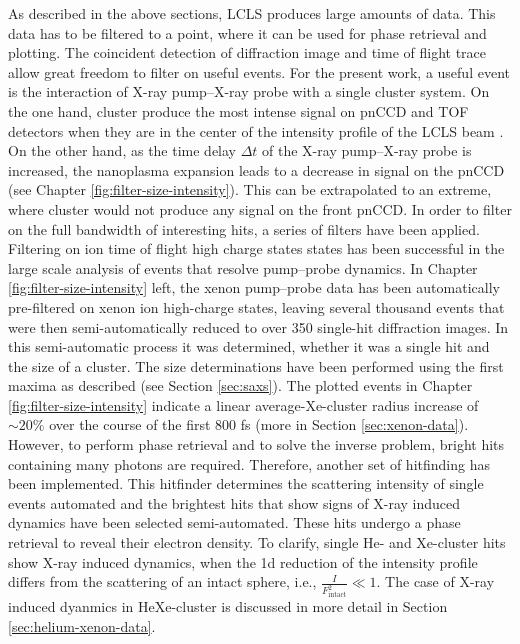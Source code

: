 As described in the above sections, LCLS produces large amounts of data. This data has to be filtered to a point, where it can be used for phase retrieval and plotting. The coincident detection of diffraction image and time of flight trace allow great freedom to filter on useful events. For the present work, a useful event is the interaction of X-ray pump--X-ray probe with a single cluster system. On the one hand, cluster produce the most intense signal on pnCCD and TOF detectors when they are in the center of the intensity profile of the LCLS beam \citep{Gorkhover-2012-PRL}. On the other hand, as the time delay $\Delta t$ of the X-ray pump--X-ray probe is increased, the nanoplasma expansion leads to a decrease in signal on the pnCCD (see Chapter \ref{fig:filter-size-intensity}). This can be extrapolated to an extreme, where cluster would not produce any signal on the front pnCCD. In order to filter on the full bandwidth of interesting hits, a series of filters have been applied. Filtering on ion time of flight high charge states states has been successful in the large scale analysis of events that resolve pump--probe dynamics. In Chapter \ref{fig:filter-size-intensity} left, the xenon pump--probe data has been automatically pre-filtered on xenon ion high-charge states, leaving several thousand events that were then semi-automatically reduced to over 350 single-hit diffraction images. In this semi-automatic process it was determined, whether it was a single hit and the size of a cluster. The size determinations have been performed using the first maxima as described (see Section \ref{sec:saxs}). The plotted events in Chapter \ref{fig:filter-size-intensity} indicate a linear average-Xe-cluster radius increase of $\sim 20\%$ over the course of the first 800 fs (more in Section \ref{sec:xenon-data}). However, to perform phase retrieval and to solve the inverse problem, bright hits containing many photons are required. Therefore, another set of hitfinding has been implemented. This hitfinder determines the scattering intensity of single events automated and the brightest hits that show signs of X-ray induced dynamics have been selected semi-automated. These hits undergo a phase retrieval to reveal their electron density. To clarify, single He- and Xe-cluster hits show X-ray induced dynamics, when the 1d reduction of the intensity profile differs from the scattering of an intact sphere, i.e., $\tfrac{I}{F_{\text{intact}}^{2}} \ll 1$. The case of X-ray induced dyanmics in HeXe-cluster is discussed in more detail in Section \ref{sec:helium-xenon-data}.
%
%
%